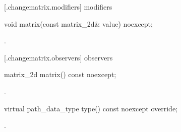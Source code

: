  [\iotwod.changematrix.modifiers]{ modifiers}

\begin{itemdecl}
    void matrix(const matrix_2d& value) noexcept;
\end{itemdecl}
\begin{itemdescr}
	\pnum
	\postconditions
	.
	
\end{itemdescr}

 [\iotwod.changematrix.observers]{ observers}

\begin{itemdecl}
    matrix_2d matrix() const noexcept;
\end{itemdecl}
\begin{itemdescr}
	\pnum
	\returns
	.

\end{itemdescr}

\begin{itemdecl}
    virtual path_data_type type() const noexcept override;
\end{itemdecl}
\begin{itemdescr}
	\pnum
	\returns
	.

\end{itemdescr}
